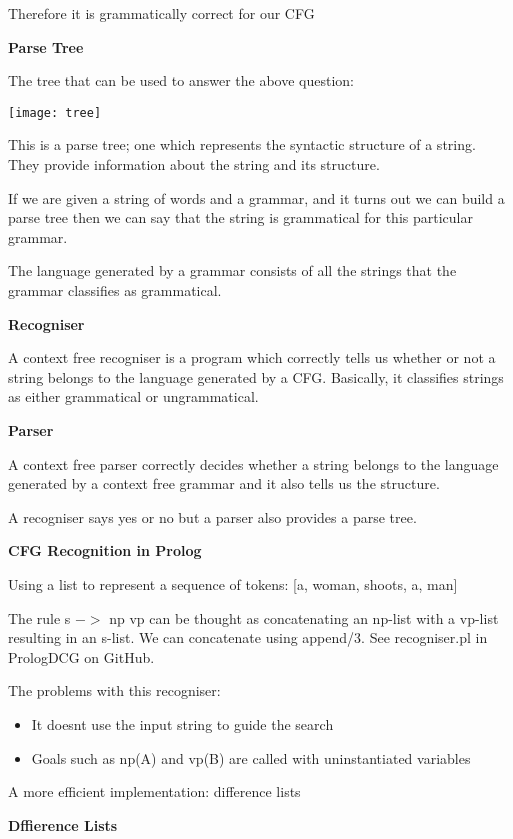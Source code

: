\documentclass{article}
\begin{document}
Therefore it is grammatically correct for our CFG


\textbf{Parse Tree}

The tree that can be used to answer the above question:

\texttt{[image: tree]}

This is a parse tree; one which represents the syntactic structure of a string. They provide information about the string and its structure.

If we are given a string of words and a grammar, and it turns out we can build a parse tree then we can say that the string is grammatical for this particular grammar.

The language generated by a grammar consists of all the strings that the grammar classifies as grammatical.


\textbf{Recogniser}

A context free recogniser is a program which correctly tells us whether or not a string belongs to the language generated by a CFG. Basically, it classifies strings as either grammatical or ungrammatical.


\textbf{Parser}

A context free parser correctly decides whether a string belongs to the language generated by a context free grammar and it also tells us the structure.


A recogniser says yes or no but a parser also provides a parse tree.



\textbf{CFG Recognition in Prolog}

Using a list to represent a sequence of tokens: [a, woman, shoots, a, man]

The rule s $->$ np vp can be thought as concatenating an np-list with a vp-list resulting in an s-list. We can concatenate using append/3. See recogniser.pl in PrologDCG on GitHub.

The problems with this recogniser:

\begin{itemize}
\item It doesnt use the input string to guide the search
\item Goals such as np(A) and vp(B) are called with uninstantiated variables
\end{itemize}


A more efficient implementation: difference lists



\textbf{Dffierence Lists}
\end{document}
